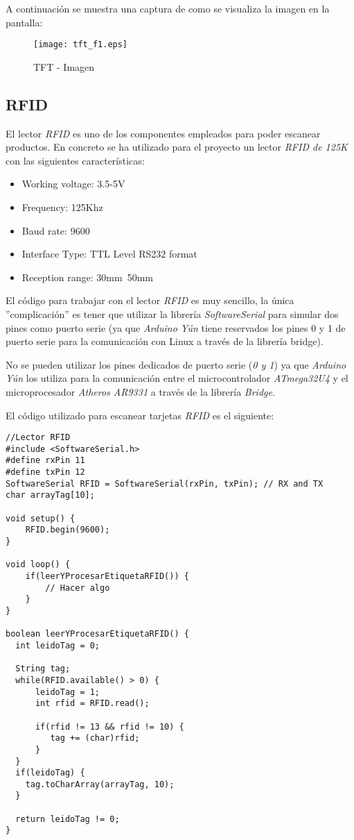 A continuación se muestra una captura de como se visualiza la imagen en la pantalla:

\begin{figure}[h!]
    \centering
    \texttt{[image: tft\_f1.eps]}
    \caption{TFT - Imagen}\label{fig:tft_f1}
\end{figure}

\subsection{RFID}


El lector \emph{RFID} es uno de los componentes empleados para poder escanear productos. En concreto se ha utilizado para el proyecto un lector \emph{RFID de 125K} con las siguientes características:

\begin{itemize}
    \item Working voltage: 3.5-5V
    \item Frequency: 125Khz
    \item Baud rate: 9600
    \item Interface Type: TTL Level RS232 format
    \item Reception range: 30mm~50mm
\end{itemize}

El código para trabajar con el lector \emph{RFID} es muy sencillo, la única ''complicación'' es tener que utilizar la librería \emph{SoftwareSerial} para simular dos pines como puerto serie (ya que \emph{Arduino Yún} tiene reservados los pines 0 y 1 de puerto serie para la comunicación con Linux a través de la librería bridge).

No se pueden utilizar los pines dedicados de puerto serie (\emph{0 y 1}) ya que \emph{Arduino Yún} los utiliza para la comunicación entre el microcontrolador \emph{ATmega32U4} y el microprocesador \emph{Atheros AR9331} a través de la librería \emph{Bridge}.

El código utilizado para escanear tarjetas \emph{RFID} es el siguiente:

\begin{lstlisting}
//Lector RFID
#include <SoftwareSerial.h>
#define rxPin 11
#define txPin 12
SoftwareSerial RFID = SoftwareSerial(rxPin, txPin); // RX and TX
char arrayTag[10];

void setup() {
    RFID.begin(9600);
}

void loop() {
    if(leerYProcesarEtiquetaRFID()) {
        // Hacer algo
    }
}

boolean leerYProcesarEtiquetaRFID() {
  int leidoTag = 0;

  String tag;
  while(RFID.available() > 0) {
      leidoTag = 1;
      int rfid = RFID.read();

      if(rfid != 13 && rfid != 10) {
         tag += (char)rfid;
      }
  }
  if(leidoTag) {
    tag.toCharArray(arrayTag, 10);
  }

  return leidoTag != 0;
}
\end{lstlisting}

